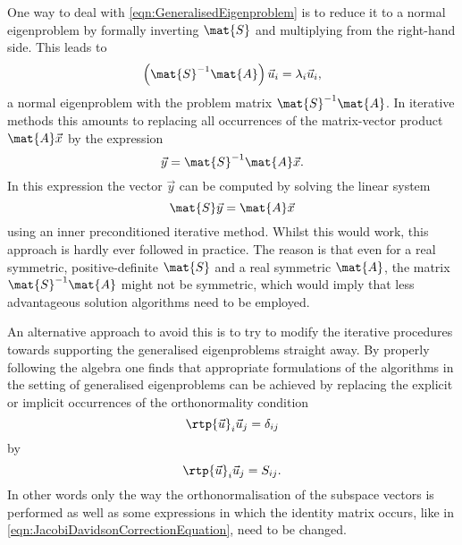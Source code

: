 One way to deal with \eqref{eqn:GeneralisedEigenproblem} is to reduce
it to a normal eigenproblem by formally inverting $\mat{S}$
and multiplying from the right-hand side.
This leads to
\[
	\left( \mat{S}^{-1} \mat{A} \right) \vec{u}_i = \lambda_i \vec{u}_i,
\]
a normal eigenproblem with the problem matrix $\mat{S}^{-1} \mat{A}$.
In iterative methods this amounts to replacing all occurrences
of the matrix-vector product $\mat{A}\vec{x}$ by the expression
\[ \vec{y} = \mat{S}^{-1} \mat{A} \vec{x}. \]
In this expression the vector $\vec{y}$ can be computed by solving the linear system
\[ \mat{S} \vec{y} = \mat{A} \vec{x} \]
using an inner preconditioned iterative method.
Whilst this would work,
this approach is hardly ever followed in practice.
The reason is that even for a real symmetric, positive-definite $\mat{S}$
and a real symmetric $\mat{A}$,
the matrix $\mat{S}^{-1} \mat{A}$ might not be symmetric,
which would imply that less advantageous solution algorithms need to be employed.

% 
%

An alternative approach to avoid this
is to try to modify the iterative procedures towards supporting the generalised
eigenproblems straight away.
By properly following the algebra one finds that
appropriate formulations of the algorithms in the setting of generalised
eigenproblems can be achieved by replacing the explicit or implicit
occurrences of the orthonormality condition
\[ \rtp{\vec{u}}_i \vec{u}_j = \delta_{ij} \]
by
\[  \rtp{\vec{u}}_i \vec{u}_j = S_{ij}. \]
In other words only the way the orthonormalisation of the subspace vectors
is performed as well as some expressions in which the identity matrix
occurs,
like in \eqref{eqn:JacobiDavidsonCorrectionEquation},
need to be changed.

